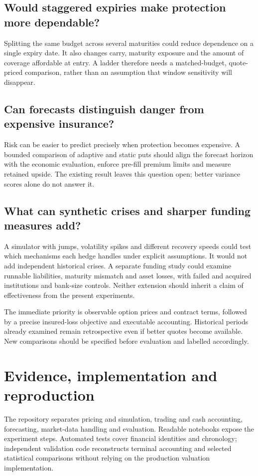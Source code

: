 \documentclass[11pt,a4paper]{article}
\begin{document}
\subsection*{Would staggered expiries make protection more dependable?}
Splitting the same budget across several maturities could reduce dependence on a single expiry date. It also changes carry, maturity exposure and the amount of coverage affordable at entry. A ladder therefore needs a matched-budget, quote-priced comparison, rather than an assumption that window sensitivity will disappear.

\subsection*{Can forecasts distinguish danger from expensive insurance?}
Risk can be easier to predict precisely when protection becomes expensive. A bounded comparison of adaptive and static puts should align the forecast horizon with the economic evaluation, enforce pre-fill premium limits and measure retained upside. The existing result leaves this question open; better variance scores alone do not answer it.

\subsection*{What can synthetic crises and sharper funding measures add?}
A simulator with jumps, volatility spikes and different recovery speeds could test which mechanisms each hedge handles under explicit assumptions. It would not add independent historical crises. A separate funding study could examine runnable liabilities, maturity mismatch and asset losses, with failed and acquired institutions and bank-size controls. Neither extension should inherit a claim of effectiveness from the present experiments.

The immediate priority is observable option prices and contract terms, followed by a precise insured-loss objective and executable accounting. Historical periods already examined remain retrospective even if better quotes become available. New comparisons should be specified before evaluation and labelled accordingly.

\nextpage
\section*{Evidence, implementation and reproduction}
The repository separates pricing and simulation, trading and cash accounting, forecasting, market-data handling and evaluation. Readable notebooks expose the experiment steps. Automated tests cover financial identities and chronology; independent validation code reconstructs terminal accounting and selected statistical comparisons without relying on the production valuation implementation.
\end{document}
